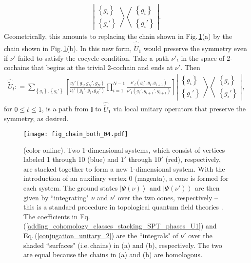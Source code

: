 \documentclass[sort&compress]{elsarticle}
\theoremstyle{theoremstyle}
\theoremstyle{framedtheoremstyle}
\theoremstyle{definitionstyle}
\theoremstyle{definitionstyle}
\theoremstyle{definitionstyle}
\theoremstyle{definitionstyle}
\theoremstyle{nameddefinitionstyle}
\theoremstyle{framednameddefinitionstyle}
\theoremstyle{proofstyle}
\theoremstyle{definitionstyle}
\newcommand{\coloneq}{\mathrel{\mathop:}=}
\newcommand{\paren}[1]{\left( #1 \right)}
\newcommand{\brackets}[1]{\left[ #1 \right]}
\newcommand{\braces}[1]{\left\{ #1 \right\}}
\newcommand{\ket}[1]{\left|#1\right\rangle}
\newcommand{\ketbra}[2]{\left| #1 \right\rangle\left\langle #2\right|}
\begin{document}
\begin{appendices}
\begin{eqnarray}
\ketbra{ \begin{matrix} \braces{g_i} \\\braces{g_i'} \end{matrix} }{ \begin{matrix} \braces{g_i} \\\braces{g_i'} \end{matrix} }.\label{conjugation_unitary_2}
\end{eqnarray}
Geometrically, this amounts to replacing the chain shown in Fig.\,\ref{fig:homologous_chains}(a) by the chain shown in Fig.\,\ref{fig:homologous_chains}(b). In this new form, $\hat{\widetilde U}_1$ would preserve the symmetry even if $\nu'$ failed to satisfy the cocycle condition. Take a path $\nu'_t$ in the space of 2-cochains that begins at the trivial 2-cochain and ends at $\nu'$. Then
\begin{eqnarray}
\hat{\widetilde U}_t \coloneq
\sum_{\braces{g_i}, \braces{g_i'}} 
\brackets{
\frac{ \nu_t'\paren{g_1,g_N',g_N} }{ \nu_t'\paren{g_1',g_1,g_N'} }
\prod_{i=1}^{N-1} \frac{ \nu'_t\paren{ g_i', g_i, g_{i+1} } }{ \nu'_t\paren{ g_i', g_{i+1}', g_{i+1} } } 
} 
\ketbra{ \begin{matrix} \braces{g_i} \\\braces{g_i'} \end{matrix} }{ \begin{matrix} \braces{g_i} \\\braces{g_i'} \end{matrix} },
\end{eqnarray}
for $0 \leq t \leq 1$, is a path from $\mathbb I$ to $\hat{\widetilde U}_1$ via local unitary operators that preserve the symmetry, as desired.

\begin{figure}[t]
\centering
\texttt{[image: fig\_chain\_both\_04.pdf]}
\caption{(color online). Two 1-dimensional systems, which consist of vertices labeled 1 through 10 (blue) and $1'$ through $10'$ (red), respectively, are stacked together to form a new 1-dimensional system. With the introduction of an auxiliary vertex $0$ (magenta), a cone is formed for each system. The ground states $\ket{\Psi(\nu)}$ and $\ket{\Psi(\nu')}$ are then given by ``integrating" $\nu$ and $\nu'$ over the two cones, respectively -- this is a standard procedure in topological quantum field theories \cite{Atiyah_TQFT}. 
The coefficients in Eq.\,(\ref{adding_cohomology_classes_stacking_SPT_phases_U1}) and Eq.\,(\ref{conjugation_unitary_2}) are the ``integrals" of $\nu'$ over the shaded ``surfaces" (i.e.\,chains) in (a) and (b), respectively.
The two are equal because the chains in (a) and (b) are homologous.
}
\label{fig:homologous_chains}
\end{figure}






\end{appendices}
\end{document}
